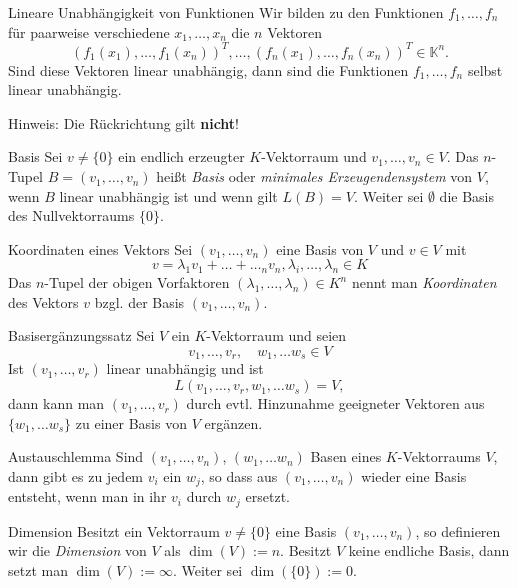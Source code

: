 \documentclass[german]{spicker}
\begin{document}
\begin{bonus}{Lineare Unabhängigkeit von Funktionen}
    Wir bilden zu den Funktionen $f_1, \ldots, f_n$ für paarweise verschiedene $x_1, \ldots, x_n$ die $n$ Vektoren
    $$
        (f_1(x_1), \ldots, f_1(x_n))^T, \ldots, (f_n(x_1), \ldots, f_n(x_n))^T \in \mathbb{K}^n.
    $$
    Sind diese Vektoren linear unabhängig, dann sind die Funktionen $f_1, \ldots, f_n$ selbst linear unabhängig.

    Hinweis: Die Rückrichtung gilt \textbf{nicht}!
\end{bonus}

\begin{defi}{Basis}
    Sei $v \neq \{0\}$ ein endlich erzeugter $K$-Vektorraum und $v_1, \ldots, v_n \in V$. Das $n$-Tupel $B = (v_1, \ldots, v_n)$ heißt \emph{Basis} oder \emph{minimales Erzeugendensystem} von $V$, wenn $B$ linear unabhängig ist und wenn gilt $L(B) = V$.
    Weiter sei $\emptyset$ die Basis des Nullvektorraums $\{0\}$.
\end{defi}

\begin{bonus}{Koordinaten eines Vektors}
    Sei $(v_1, \ldots, v_n)$ eine Basis von $V$ und $v \in V$ mit
    $$
        v = \lambda_1v_1 + \ldots + \ldots_nv_n, \lambda_i, \ldots, \lambda_n \in K
    $$
    Das $n$-Tupel der obigen Vorfaktoren $(\lambda_1, \ldots, \lambda_n) \in K^n$ nennt man \emph{Koordinaten} des Vektors $v$ bzgl. der Basis $(v_1, \ldots, v_n)$.
\end{bonus}

\begin{defi}{Basisergänzungssatz}
    Sei $V$ ein $K$-Vektorraum und seien
    $$
        v_1, \ldots, v_r, \quad w_1, \ldots w_s \in V
    $$
    Ist $(v_1, \ldots, v_r)$ linear unabhängig und ist
    $$
        L(v_1, \ldots, v_r, w_1, \ldots w_s) = V,
    $$
    dann kann man $(v_1, \ldots, v_r)$ durch evtl. Hinzunahme geeigneter Vektoren aus $\{w_1, \ldots w_s\}$ zu einer Basis von $V$ ergänzen.
\end{defi}

\begin{defi}{Austauschlemma}
    Sind $(v_1, \ldots, v_n)$, $(w_1, \ldots w_n)$ Basen eines $K$-Vektorraums $V$, dann gibt es zu jedem $v_i$ ein $w_j$, so dass aus $(v_1, \ldots, v_n)$ wieder eine Basis entsteht, wenn man in ihr $v_i$ durch $w_j$ ersetzt.
\end{defi}

\begin{defi}{Dimension}
    Besitzt ein Vektorraum $v \neq \{0\}$ eine Basis $(v_1, \ldots, v_n)$, so definieren wir die \emph{Dimension} von $V$ als $\dim(V) := n$.
    Besitzt $V$ keine endliche Basis, dann setzt man $\dim(V) := \infty$. Weiter sei $\dim(\{0\}) := 0$.
\end{defi}
\end{document}
